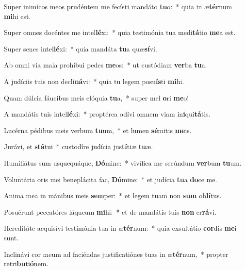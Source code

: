\item Super inimícos meos prudéntem me fecísti mandáto \textbf{tu}o:~* quia in æ\textbf{tér}num \textbf{mi}hi est.
\item Super omnes docéntes me intel\textbf{lé}xi:~* quia testimónia tua medi\textbf{tá}tio \textbf{me}a est.
\item Super senes intel\textbf{lé}xi:~* quia mandáta \textbf{tu}a quæ\textbf{sí}vi.
\item Ab omni via mala prohíbui pedes \textbf{me}os:~* ut custódiam \textbf{ver}ba \textbf{tu}a.
\item A judíciis tuis non decli\textbf{ná}vi:~* quia tu legem posu\textbf{ís}ti \textbf{mi}hi.
\item Quam dúlcia fáucibus meis elóquia \textbf{tu}a,~* super mel \textbf{o}ri \textbf{me}o!
\item A mandátis tuis intel\textbf{lé}xi:~* proptérea odívi omnem viam in\textbf{i}qui\textbf{tá}tis.
\item Lucérna pédibus meis verbum \textbf{tu}um,~* et lumen \textbf{sé}mitis \textbf{me}is.
\item Jurávi, et \textbf{stá}tui~* custodíre judícia jus\textbf{tí}tiæ \textbf{tu}æ.
\item Humiliátus sum usquequáque, \textbf{Dó}mine:~* vivífica me secúndum \textbf{ver}bum \textbf{tu}um.
\item Voluntária oris mei beneplácita fac, \textbf{Dó}mine:~* et judícia \textbf{tu}a \textbf{do}ce me.
\item Anima mea in mánibus meis \textbf{sem}per:~* et legem tuam non \textbf{sum} ob\textbf{lí}tus.
\item Posuérunt peccatóres láqueum \textbf{mi}hi:~* et de mandátis tuis \textbf{non} er\textbf{rá}vi.
\item Hereditáte acquisívi testimónia tua in æ\textbf{tér}num:~* quia exsultátio \textbf{cor}dis \textbf{me}i sunt.
\item Inclinávi cor meum ad faciéndas justificatiónes tuas in æ\textbf{tér}num,~* propter retri\textbf{bu}ti\textbf{ó}nem.
